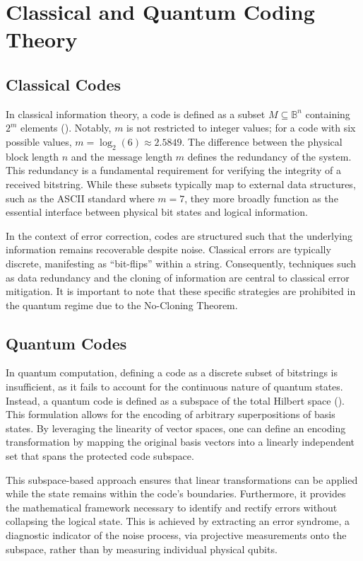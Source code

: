 \chapter{Classical and Quantum Coding Theory}

\section{Classical Codes}

In classical information theory, a code is defined as a subset $M \subseteq \mathbb{B}^n$ containing $2^m$ elements (\cite{Kitaev2002}). Notably, $m$ is not restricted to integer values; for a code with six possible values, $m = \log_2(6) \approx 2.5849$. The difference between the physical block length $n$ and the message length $m$ defines the redundancy of the system. This redundancy is a fundamental requirement for verifying the integrity of a received bitstring. While these subsets typically map to external data structures, such as the ASCII standard where $m = 7$, they more broadly function as the essential interface between physical bit states and logical information.

In the context of error correction, codes are structured such that the underlying information remains recoverable despite noise. Classical errors are typically discrete, manifesting as ``bit-flips'' within a string. Consequently, techniques such as data redundancy and the cloning of information are central to classical error mitigation. It is important to note that these specific strategies are prohibited in the quantum regime due to the No-Cloning Theorem.

\section{Quantum Codes}

In quantum computation, defining a code as a discrete subset of bitstrings is insufficient, as it fails to account for the continuous nature of quantum states. Instead, a quantum code is defined as a subspace of the total Hilbert space (\cite{Kitaev2002}). This formulation allows for the encoding of arbitrary superpositions of basis states. By leveraging the linearity of vector spaces, one can define an encoding transformation by mapping the original basis vectors into a linearly independent set that spans the protected code subspace.

This subspace-based approach ensures that linear transformations can be applied while the state remains within the code's boundaries. Furthermore, it provides the mathematical framework necessary to identify and rectify errors without collapsing the logical state. This is achieved by extracting an error syndrome, a diagnostic indicator of the noise process, via projective measurements onto the subspace, rather than by measuring individual physical qubits.

